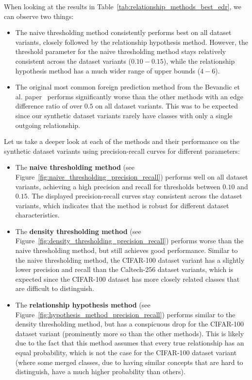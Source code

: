 When looking at the results in Table~\ref{tab:relationship_methods_best_edr},
we can observe two things:
\begin{itemize}
      \item The naive thresholding method consistently performs best on all dataset variants,
            closely followed by the relationship hypothesis method.
            However, the threshold parameter for the naive thresholding method
            stays relatively consistent across the dataset variants ($0.10 - 0.15$),
            while the relationship hypothesis method has a much wider range of upper bounds ($4 - 6$).
      \item The original most common foreign prediction method
            from the Bevandic et al. paper~\cite{bevandic_automatic_2022} performs significantly
            worse than the other methods with an edge difference ratio of over $0.5$ on all dataset variants.
            This was to be expected since our synthetic dataset variants rarely have
            classes with only a single outgoing relationship.
\end{itemize}

Let us take a deeper look at each of the methods and their performance
on the synthetic dataset variants using precision-recall curves for different parameters:
\begin{itemize}
      \item The \textbf{naive thresholding method} (see Figure~\ref{fig:naive_thresholding_precision_recall})
            performs well on all dataset variants, achieving a high precision and recall
            for thresholds between $0.10$ and $0.15$.
            The displayed precision-recall curves stay consistent across the dataset variants,
            which indicates that the method is robust for different dataset characteristics.
      \item The \textbf{density thresholding method} (see Figure~\ref{fig:density_thresholding_precision_recall})
            performs worse than the naive thresholding method,
            but still achieves good performance.
            Similar to the naive thresholding method, the CIFAR-100 dataset variant
            has a slightly lower precision and recall than the Caltech-256 dataset variants,
            which is expected since the CIFAR-100 dataset has more closely related classes
            that are difficult to distinguish.
      \item The \textbf{relationship hypothesis method} (see Figure~\ref{fig:hypothesis_method_precision_recall})
            performs similar to the density thresholding method,
            but has a conspicuous drop for the CIFAR-100 dataset variant
            (prominently more so than the other methods).
            This is likely due to the fact that this method assumes that
            every true relationship has an equal probability,
            which is not the case for the CIFAR-100 dataset variant
            (where some merged classes, due to having similar concepts that are hard to distinguish,
            have a much higher probability than others).
\end{itemize}


